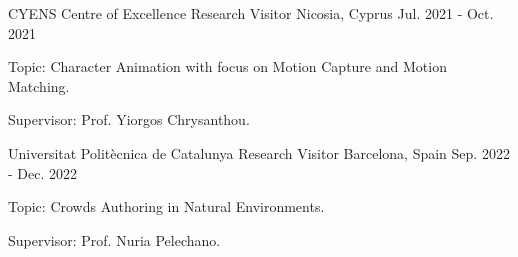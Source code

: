 

\begin{cventries}

  \cventry
    {CYENS Centre of Excellence} %
    {Research Visitor} %
    {Nicosia, Cyprus} %
    {Jul. 2021 - Oct. 2021} %
    {
      \begin{cvitems} %
        \item {Topic: Character Animation with focus on Motion Capture and Motion Matching.}
        \item {Supervisor: Prof. Yiorgos Chrysanthou.}
      \end{cvitems}
    }

\cventry
    {Universitat Politècnica de Catalunya} %
    {Research Visitor} %
    {Barcelona, Spain} %
    {Sep. 2022 - Dec. 2022} %
    {
      \begin{cvitems} %
        \item {Topic: Crowds Authoring in Natural Environments.}
        \item {Supervisor: Prof. Nuria Pelechano.}
      \end{cvitems}
    }

\end{cventries}
